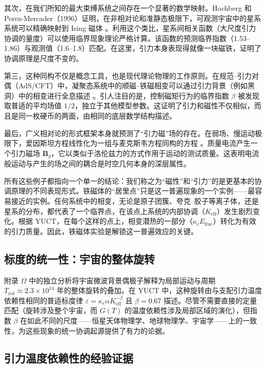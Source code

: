 \documentclass[12pt]{article}
\theoremstyle{remark}
\begin{document}
	其次，在我们所知的最大束缚系统之间存在一个显著的数学映射。Hochberg 和 Perez-Mercader（1996）证明，在非相对论和准静态极限下，可观测宇宙中的星系系统可以精确映射到 Ising 磁体 \cite{Hochberg1996}。利用这个类比，星系间相关函数（大尺度引力协调的量度）可以使用临界现象理论严格计算。该函数的预测临界指数（1.53–1.86）与观测值（1.6–1.8）匹配。在这里，引力本身表现得就像一块磁铁，证明了协调原理是尺度不变的。
	
	第三，这种同构不仅是概念工具，也是现代理论物理的工作原则。在规范–引力对偶（AdS/CFT）中，凝聚态系统中的顺磁–铁磁相变可以通过引力背景（例如黑洞）中的相变进行全息描述 \cite{Ghotbabadi2021, Zbl2021}。引人注目的是，控制磁矩行为的临界指数 $\beta$ 被发现取普适的平均场值 $1/2$，独立于其他模型参数。这证明了引力和磁性不仅相似，而且是同一枚硬币的两面，由相同的底层数学结构描述。
	
	最后，广义相对论的形式框架本身就预测了“引力磁”场的存在。在弱场、慢运动极限下，爱因斯坦方程线性化为一组与麦克斯韦方程同构的方程 \cite{ciufolini1995}。质量电流产生一个引力磁场 $ \mathbf{B}_g$，它以类似于洛伦兹力的方式作用于运动的测试质量。这表明电流般运动与产生的场之间的耦合是时空几何本身的深层属性。
	
	所有这些例子都指向一个单一的结论：我们称之为“磁性”和“引力”的是更基本的协调原理的不同表现形式。铁磁体的“居里点”只是这一普遍现象的一个实例——最容易接近的实例。任何系统中的相变，无论是原子团簇、夸克–胶子等离子体，还是星系的分布，都代表了一个临界点，在该点上系统的内部协调（$K_{\mathrm{eff}}$）发生剧烈变化。根据 YUCT，在每个这样的点上，相变潜热的一部分（$\kappa_c E_{\mathrm{fluc}}$）转化为有效的引力质量。因此，铁磁体实验是解锁这一普遍效应的关键。
	
	\subsection{标度的统一性：宇宙的整体旋转}
	
	附录 $\Omega$ 中的独立分析将宇宙微波背景偶极子解释为局部运动与周期 $T_{\mathrm{rot}} \approx 2.3\times10^{14}$ 年的整体旋转的叠加。在 YUCT 中，这种旋转由与支配引力温度依赖性相同的普适标度律 $\varepsilon = \kappa_c \alpha K_{\mathrm{eff}}^{-\beta}$ 且 $\beta = 0.67$ 描述。尽管不需要直接的定量匹配（旋转涉及整个宇宙，而 $G(T)$ 的温度依赖性涉及局部区域的演化），但指数 $\beta$ 在如此不同的尺度——恒星天体物理学、地球物理学、宇宙学——上的一致性，为这些现象的统一协调起源提供了有力的论据。
	
	\subsection{引力温度依赖性的经验证据}
	\label{sec:empirical}
	
\end{document}
